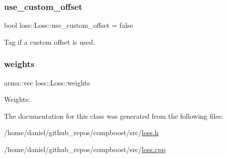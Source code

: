 \mbox{\label{classloss_1_1_loss_a5fabbbb104e6f430498630130ac8a131}} 
\subsubsection{\texorpdfstring{use\+\_\+custom\+\_\+offset}{use\_custom\_offset}}
{\footnotesize\ttfamily bool loss\+::\+Loss\+::use\+\_\+custom\+\_\+offset = false\hspace{0.3cm}{\ttfamily [protected]}}



Tag if a custom offset is used. 

\mbox{\label{classloss_1_1_loss_a4cfecaa4e3a6244ec82651607340e751}} 
\subsubsection{\texorpdfstring{weights}{weights}}
{\footnotesize\ttfamily arma\+::vec loss\+::\+Loss\+::weights\hspace{0.3cm}{\ttfamily [protected]}}



Weights\+: 



The documentation for this class was generated from the following files\+:\begin{DoxyCompactItemize}
\item 
/home/daniel/github\+\_\+repos/compboost/src/\hyperlink{loss_8h}{loss.\+h}\item 
/home/daniel/github\+\_\+repos/compboost/src/\hyperlink{loss_8cpp}{loss.\+cpp}\end{DoxyCompactItemize}
